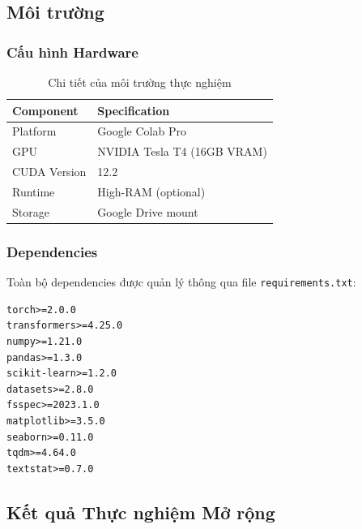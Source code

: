 \subsection{Môi trường}
\label{subsec:environment}

\subsubsection{Cấu hình Hardware}
\label{subsubsec:hardware_config}

\begin{table}[H]
\centering
\caption{Chi tiết của môi trường thực nghiệm}
\label{tab:hardware_specs}
\begin{tabular}{ll}
\toprule
\textbf{Component} & \textbf{Specification} \\
\midrule
Platform & Google Colab Pro \\
GPU & NVIDIA Tesla T4 (16GB VRAM) \\
CUDA Version & 12.2 \\
Runtime & High-RAM (optional) \\
Storage & Google Drive mount \\
\bottomrule
\end{tabular}
\end{table}

\subsubsection{Dependencies}
\label{subsubsec:software_deps}

Toàn bộ dependencies được quản lý thông qua file \texttt{requirements.txt}:
\begin{verbatim}
torch>=2.0.0
transformers>=4.25.0 
numpy>=1.21.0
pandas>=1.3.0
scikit-learn>=1.2.0
datasets>=2.8.0
fsspec>=2023.1.0
matplotlib>=3.5.0
seaborn>=0.11.0
tqdm>=4.64.0
textstat>=0.7.0
\end{verbatim}

\subsection{Kết quả Thực nghiệm Mở rộng}
\label{subsec:extended_results}

